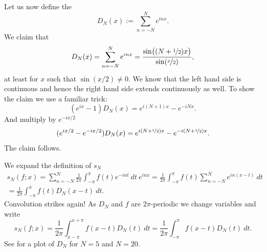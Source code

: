 Let us now define the \emph{}
\begin{equation*}
D_N(x) := \sum_{n=-N}^N e^{inx} .
\end{equation*}
We claim that
\begin{equation*}
D_N(x) =
\sum_{n=-N}^N e^{inx}
=
\frac{\sin\bigl( (N+\nicefrac{1}{2})x \bigr)}{\sin(\nicefrac{x}{2})} ,
\end{equation*}
at least for $x$ such that $\sin(x/2) \not= 0$.  We know that the left hand
side is continuous and hence the right hand side extends continuously as well.
To show the claim
we use a familiar trick:
\begin{equation*}
(e^{ix}-1) D_N(x) = e^{i(N+1)x} - e^{-iNx} .
\end{equation*}
And multiply by $e^{-ix/2}$
\begin{equation*}
(e^{ix/2}-e^{-ix/2}) D_N(x) = e^{i(N+\nicefrac{1}{2})x} -
e^{-i(N+\nicefrac{1}{2})x} .
\end{equation*}
The claim follows.

We expand the definition of $s_N$
\begin{multline*}
s_N(f;x) = 
\sum_{n=-N}^N \frac{1}{2\pi} \int_{-\pi}^\pi f(t) e^{-int}  ~  dt ~ e^{inx}
=
\frac{1}{2\pi} \int_{-\pi}^\pi f(t) \sum_{n=-N}^N e^{in(x-t)} ~ dt
\\
=
\frac{1}{2\pi} \int_{-\pi}^\pi f(t) D_N(x-t) ~ dt .
\end{multline*}
Convolution strikes again!
As $D_N$ and $f$ are $2\pi$-periodic we change variables and write 
\begin{equation*}
s_N(f;x) = 
\frac{1}{2\pi} \int_{x-\pi}^{x+\pi} f(x-t) D_N(t) ~ dt
=
\frac{1}{2\pi} \int_{-\pi}^\pi f(x-t) D_N(t) ~ dt .
\end{equation*}
See  for a plot of $D_N$ for $N=5$ and $N=20$.

